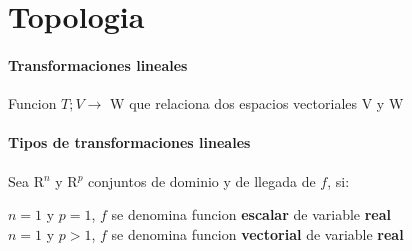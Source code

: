 \documentclass[12pt]{article}
\begin{document}
\maketitle

\section{Topologia}

\paragraph{Transformaciones lineales}
Funcion  $T; V \rightarrow$ W que relaciona dos espacios vectoriales V y W 
\paragraph{Tipos de transformaciones lineales}
Sea R$^n$ y R$^p$ conjuntos de dominio y de llegada de $f$, si:

$n = 1$ y $p = 1$, $f$ se denomina funcion \textbf{escalar} de variable \textbf{real}\\
$n=1$ y $p>1$, $f$ se denomina funcion \textbf{vectorial} de variable \textbf{real}
\end{document}
